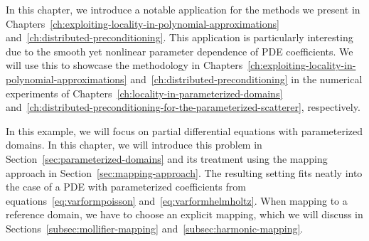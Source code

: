 In this chapter, we introduce a notable application for the methods we present in Chapters~\ref{ch:exploiting-locality-in-polynomial-approximations} and~\ref{ch:distributed-preconditioning}.
This application is particularly interesting due to the smooth yet nonlinear parameter dependence of PDE coefficients.
We will use this to showcase the methodology in Chapters~\ref{ch:exploiting-locality-in-polynomial-approximations} and~\ref{ch:distributed-preconditioning} in the numerical experiments of Chapters~\ref{ch:locality-in-parameterized-domains} and~\ref{ch:distributed-preconditioning-for-the-parameterized-scatterer}, respectively.

In this example, we will focus on partial differential equations with parameterized domains.
In this chapter, we will introduce this problem in Section~\ref{sec:parameterized-domains} and its treatment using the mapping approach in Section~\ref{sec:mapping-approach}.
The resulting setting fits neatly into the case of a PDE with parameterized coefficients from equations~\eqref{eq:varformpoisson} and~\eqref{eq:varformhelmholtz}.
When mapping to a reference domain, we have to choose an explicit mapping, which we will discuss in Sections~\ref{subsec:mollifier-mapping} and~\ref{subsec:harmonic-mapping}.
